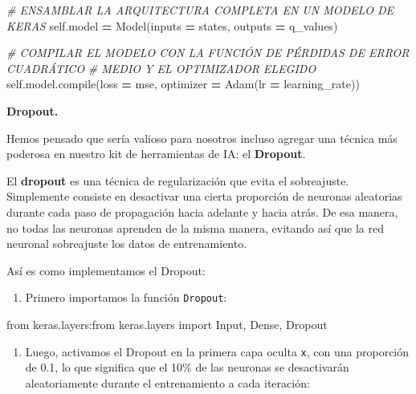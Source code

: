 \documentclass[
]{book}
\newenvironment{Shaded}{\begin{snugshade}}{\end{snugshade}}
\newcommand{\BuiltInTok}[1]{#1}
\newcommand{\CommentTok}[1]{\textcolor[rgb]{0.56,0.35,0.01}{\textit{#1}}}
\newcommand{\ImportTok}[1]{#1}
\newcommand{\NormalTok}[1]{#1}
\newcommand{\OperatorTok}[1]{\textcolor[rgb]{0.81,0.36,0.00}{\textbf{#1}}}
\newcommand{\StringTok}[1]{\textcolor[rgb]{0.31,0.60,0.02}{#1}}
\newcommand{\VariableTok}[1]{\textcolor[rgb]{0.00,0.00,0.00}{#1}}
\providecommand{\tightlist}{%
  \setlength{\itemsep}{0pt}\setlength{\parskip}{0pt}}
\begin{document}
\begin{Shaded}
\begin{Highlighting}[]
        \CommentTok{\# ENSAMBLAR LA ARQUITECTURA COMPLETA EN UN MODELO DE KERAS}
        \VariableTok{self}\NormalTok{.model }\OperatorTok{=}\NormalTok{ Model(inputs }\OperatorTok{=}\NormalTok{ states, outputs }\OperatorTok{=}\NormalTok{ q\_values)}
        
        \CommentTok{\# COMPILAR EL MODELO CON LA FUNCIÓN DE PÉRDIDAS DE ERROR CUADRÁTICO }
        \CommentTok{\# MEDIO Y EL OPTIMIZADOR ELEGIDO}
        \VariableTok{self}\NormalTok{.model.}\BuiltInTok{compile}\NormalTok{(loss }\OperatorTok{=} \StringTok{\textquotesingle{}mse\textquotesingle{}}\NormalTok{, optimizer }\OperatorTok{=}\NormalTok{ Adam(lr }\OperatorTok{=}\NormalTok{ learning\_rate))}
\end{Highlighting}
\end{Shaded}

\textbf{Dropout.}

Hemos pensado que sería valioso para nosotros incluso agregar una técnica más poderosa en nuestro kit de herramientas de IA: el \textbf{Dropout}.

El \textbf{dropout} es una técnica de regularización que evita el sobreajuste. Simplemente consiste en desactivar una cierta proporción de neuronas aleatorias durante cada paso de propagación hacia adelante y hacia atrás. De esa manera, no todas las neuronas aprenden de la misma manera, evitando así que la red neuronal sobreajuste los datos de entrenamiento.

Así es como implementamos el Dropout:

\begin{enumerate}
\def\labelenumi{\arabic{enumi}.}
\tightlist
\item
  Primero importamos la función \texttt{Dropout}:
\end{enumerate}

\begin{Shaded}
\begin{Highlighting}[]
    \ImportTok{from}\NormalTok{ keras.layers:}\ImportTok{from}\NormalTok{ keras.layers }\ImportTok{import}\NormalTok{ Input, Dense, Dropout}
\end{Highlighting}
\end{Shaded}

\begin{enumerate}
\def\labelenumi{\arabic{enumi}.}
\setcounter{enumi}{1}
\tightlist
\item
  Luego, activamos el Dropout en la primera capa oculta \texttt{x}, con una proporción de 0.1, lo que significa que el 10\% de las neuronas se desactivarán aleatoriamente durante el entrenamiento a cada iteración:
\end{enumerate}
\end{document}
